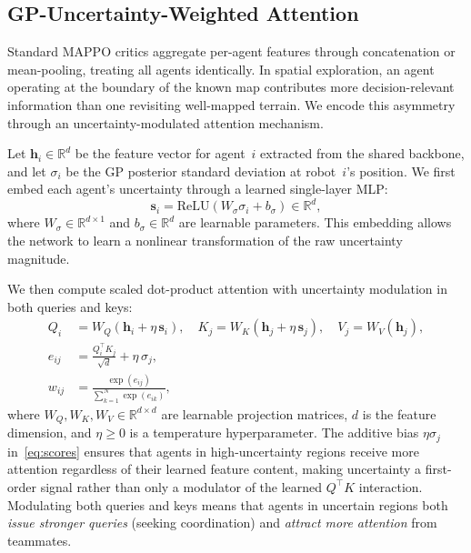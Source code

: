 \documentclass[letterpaper]{IEEEtran}
\newcommand{\Rbb}{\mathbb{R}}
\begin{document}
\subsection{GP-Uncertainty-Weighted Attention}
\label{sec:attention}

Standard MAPPO critics aggregate per-agent features through concatenation or mean-pooling, treating all agents identically. In spatial exploration, an agent operating at the boundary of the known map contributes more decision-relevant information than one revisiting well-mapped terrain. We encode this asymmetry through an uncertainty-modulated attention mechanism.

Let $\mathbf{h}_i \in \Rbb^d$ be the feature vector for agent~$i$ extracted from the shared backbone, and let $\sigma_i$ be the GP posterior standard deviation at robot~$i$'s position. We first embed each agent's uncertainty through a learned single-layer MLP:
\begin{equation}
\mathbf{s}_i = \text{ReLU}(W_\sigma \sigma_i + b_\sigma) \in \Rbb^d,
\label{eq:sigma_embed}
\end{equation}
where $W_\sigma \in \Rbb^{d \times 1}$ and $b_\sigma \in \Rbb^d$ are learnable parameters. This embedding allows the network to learn a nonlinear transformation of the raw uncertainty magnitude.

We then compute scaled dot-product attention with uncertainty modulation in both queries and keys:
\begin{align}
Q_i &= W_Q(\mathbf{h}_i + \eta \, \mathbf{s}_i), \quad K_j = W_K(\mathbf{h}_j + \eta \, \mathbf{s}_j), \quad V_j = W_V(\mathbf{h}_j), \label{eq:qkv} \\
e_{ij} &= \frac{Q_i^\top K_j}{\sqrt{d}} + \eta \, \sigma_j, \label{eq:scores} \\
w_{ij} &= \frac{\exp(e_{ij})}{\sum_{k=1}^{N} \exp(e_{ik})}, \label{eq:weights}
\end{align}
where $W_Q, W_K, W_V \in \Rbb^{d \times d}$ are learnable projection matrices, $d$ is the feature dimension, and $\eta \geq 0$ is a temperature hyperparameter. The additive bias $\eta \sigma_j$ in~\eqref{eq:scores} ensures that agents in high-uncertainty regions receive more attention regardless of their learned feature content, making uncertainty a first-order signal rather than only a modulator of the learned $Q^\top K$ interaction. Modulating both queries and keys means that agents in uncertain regions both \emph{issue stronger queries} (seeking coordination) and \emph{attract more attention} from teammates.
\end{document}
